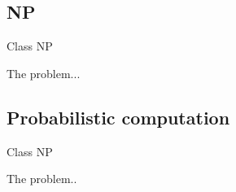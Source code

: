 \subsection{NP}
\begin{definition}
Class NP
\end{definition}
\begin{example}
The problem...
\end{example}
\subsection{Probabilistic computation}
\begin{definition}
Class NP
\end{definition}
\begin{example}
The problem..
\end{example}
